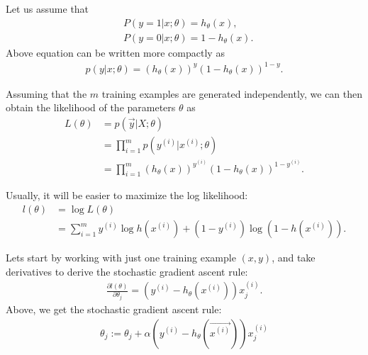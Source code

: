 \documentclass[10pt,onecolumn]{book}
\begin{document}
Let us assume that 
\begin{equation}
\begin{split}
& P(y = 1 | x;\theta) = h_\theta(x), \\
& P(y = 0 | x; \theta) = 1 - h_\theta(x).
\end{split}
\end{equation}
Above equation can be written more compactly as
\begin{equation}
\begin{split}
p(y|x;\theta) = (h_\theta(x)) ^y (1- h_\theta(x))^{1 - y}.
\end{split}
\end{equation}

Assuming that the $m$ training examples are generated independently, we can then obtain the likelihood of the parameters $\theta$ as
\begin{equation}
\begin{split}
L(\theta) &= p(\vec{y} | X; \theta) \\
			&= \prod_{i=1}^m p(y^{(i)} | x^{(i)}; \theta)\\
			&= \prod_{i=1}^m (h_\theta(x)) ^{y^{(i)}} (1- h_\theta(x))^{1 - y^{(i)}}.
\end{split}
\end{equation}

Usually, it will be easier to maximize the log likelihood:
\begin{equation}
\begin{split}
l(\theta) &= \log L(\theta) \\ 
		&= \sum_{i=1}^m y^{(i)} \log h(x^{(i)}) + (1 - y^{(i)}) \log (1 - h(x^{(i)})).
\end{split}
\end{equation}



Lets start by working with just one training example $(x, y)$, and take derivatives to derive the stochastic gradient ascent rule:
\begin{equation}
\begin{split}
\frac{\partial l(\theta)}{\partial \theta_j} = (y^{(i)} - h_\theta(x^{(i)})) x^{(i)}_j.
\end{split}
\end{equation}
Above, we get the stochastic gradient ascent rule:
\begin{equation}
\begin{split}
\theta_j := \theta_j + \alpha (y^{(i)} - h_\theta(\overrightarrow{{x^{(i)}}}))x^{(i)}_j
\end{split}
\end{equation}
\end{document}
